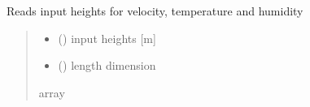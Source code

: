 \documentclass[letterpaper,10pt,english]{sphinxmanual}
\begin{document}
\begin{fulllineitems}
\label{\detokenize{users_guide:AirSeaFluxCode.util_subs.get_heights}}
\pysigstartsignatures
{}
\pysigstopsignatures
\sphinxAtStartPar
Reads input heights for velocity, temperature and humidity
\begin{quote}\begin{description}
\begin{itemize}
\item {} 
\sphinxAtStartPar
{} () \textendash{} input heights {[}m{]}

\item {} 
\sphinxAtStartPar
{} () \textendash{} length dimension

\end{itemize}

\sphinxAtStartPar
{}

\sphinxAtStartPar
array

\end{description}\end{quote}

\end{fulllineitems}

\end{document}

